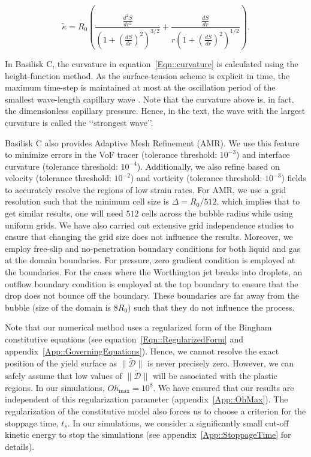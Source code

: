 \begin{equation}\label{Eqn::curvature}
	\tilde{\kappa} = R_0\left(\frac{\frac{d^2S}{dr^2}}{\left(1 + \left(\frac{dS}{dr}\right)^2\right)^{3/2}} + \frac{\frac{dS}{dr}}{r\left(1 + \left(\frac{dS}{dr}\right)^2\right)^{1/2}}\right).
\end{equation}

In Basilisk C, the curvature in equation~\eqref{Eqn::curvature} is calculated using the height-function method.  As the surface-tension scheme is explicit in time, the maximum time-step is maintained at most at the oscillation period of the smallest wave-length capillary wave \citep{popinet2009accurate, basiliskpopinet2}.
Note that the curvature above is, in fact, the dimensionless capillary pressure. Hence, in the text, the wave with the largest curvature is called the \lq\lq strongest wave\rq\rq.

Basilisk C also provides Adaptive Mesh Refinement (AMR). We use this feature to minimize errors in the VoF tracer (tolerance threshold: $10^{-3}$) and interface curvature (tolerance threshold: $10^{-4}$). Additionally, we also refine based on velocity (tolerance threshold: $10^{-2}$) and vorticity (tolerance threshold: $10^{-3}$) fields to accurately resolve the regions of low strain rates. For AMR, we use a grid resolution such that the minimum cell size is $\Delta = R_0/512$, which implies that to get similar results, one will need $512$ cells across the bubble radius while using uniform grids. We have also carried out extensive grid independence studies to ensure that changing the grid size does not influence the results. Moreover, we employ free-slip and no-penetration boundary conditions for both liquid and gas at the domain boundaries. For pressure, zero gradient condition is employed at the boundaries. For the cases where the Worthington jet breaks into droplets, an outflow boundary condition is employed at the top boundary to ensure that the drop does not bounce off the boundary. These boundaries are far away from the bubble (size of the domain is $8R_0$)  such that they do not influence the process. 

Note that our numerical method uses a regularized form of the Bingham constitutive equations (see equation~\eqref{Eqn::RegularizedForm} and appendix~\ref{App::GoverningEquations}). Hence, we cannot resolve the exact position of the yield surface as $\|\boldsymbol{\tilde{\mathcal{D}}}\|$ is never precisely zero. However, we can safely assume that low values of $\|\boldsymbol{\tilde{\mathcal{D}}}\|$ will be associated with the plastic regions. In our simulations, $Oh_{\text{max}}=10^8$. We have ensured that our results are independent of this regularization parameter (appendix~\ref{App::OhMax}). The regularization of the constitutive model also forces us to choose a criterion for the stoppage time, $t_s$. In our simulations, we consider a significantly small cut-off kinetic energy to stop the simulations (see appendix~\ref{App::StoppageTime} for details). 

